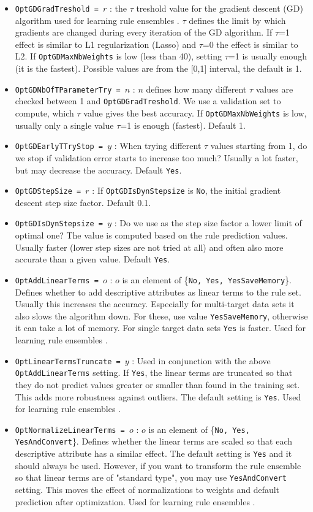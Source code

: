 \documentclass[a4paper]{report}
\begin{document}
\begin{itemize}
	\item \texttt{OptGDGradTreshold = $r$} : the $\tau$ treshold value for the gradient descent (GD) algorithm used for learning rule ensembles \cite{Aho2009}. $\tau$ defines the limit by which gradients are changed during every iteration of the GD algorithm. If $\tau$=1 effect is similar to L1 regularization (Lasso) and $\tau$=0 the effect is similar to L2. If \texttt{OptGDMaxNbWeights} is low (less than 40), setting $\tau$=1 is usually enough (it is the fastest). Possible values are from the [0,1] interval, the default is 1.
	\item \texttt{OptGDNbOfTParameterTry = $n$} : $n$ defines how many different $\tau$ values are checked between 1 and \texttt{Opt\-GD\-Grad\-Treshold}. We use a validation set to compute, which $\tau$ value gives the best accuracy. If \texttt{OptGDMaxNbWeights} is low, usually only a single value $\tau$=1 is enough (fastest). Default 1.
	\item \texttt{OptGDEarlyTTryStop = $y$} : When trying different $\tau$ values starting from 1, do we stop if validation error starts to increase too much? Usually a lot faster, but may decrease the accuracy. Default \texttt{Yes}.
	\item \texttt{OptGDStepSize = $r$} : If \texttt{OptGDIsDynStepsize} is \texttt{No}, the initial gradient descent step size factor. Default 0.1.
	\item \texttt{OptGDIsDynStepsize = $y$} : Do we use as the step size factor a lower limit of optimal one? The value is computed based on the rule prediction values. Usually faster (lower step sizes are not tried at all) and often also more accurate than a given value. Default \texttt{Yes}.
	\item \texttt{OptAddLinearTerms = $o$} : $o$ is an element of \{\texttt{No, Yes, YesSaveMemory}\}. Defines whether to add descriptive attributes as linear terms to the rule set. Usually this increases the accuracy. Especially for multi-target data sets it also slows the algorithm down. For these, use value \texttt{YesSaveMemory}, otherwise it can take a lot of memory. For single target data sets \texttt{Yes} is faster. Used for learning rule ensembles \cite{Aho2009}.
	\item \texttt{OptLinearTermsTruncate = $y$} : Used in conjunction with the above \texttt{OptAddLinearTerms} setting. If \texttt{Yes}, the linear terms are truncated so that they do not predict values greater or smaller than found in the training set. This adds more robustness against outliers. The default setting is \texttt{Yes}. Used for learning rule ensembles \cite{Aho2009}.
	\item \texttt{OptNormalizeLinearTerms = $o$} : $o$ is an element of \{\texttt{No, Yes, YesAndConvert}\}. Defines whether the linear terms are scaled so that each descriptive attribute has a similar effect. The default setting is \texttt{Yes} and it should always be used. However, if you want to transform the rule ensemble so that linear terms are of "standard type", you may use \texttt{YesAndConvert} setting. This moves the effect of normalizations to weights and default prediction after optimization. Used for learning rule ensembles \cite{Aho2009}.
\end{itemize}
\end{document}
